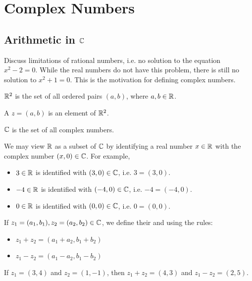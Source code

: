 \documentclass[11pt,fleqn,dvipsnames,usenames]{article}
\newcommand{\p}{\noindent}
\begin{document}
\section{Complex Numbers}

\subsection{Arithmetic in $\mathbb{C}$}

\p Discuss limitations of rational numbers, i.e. no solution to the equation $x^2 - 2 = 0$.  While the real numbers do not have this problem, there is still no solution to $x^2 + 1 = 0$.  This is the motivation for defining complex numbers.
\vsp

\recall $\mathbb{R}^{2}$ is the set of all ordered pairs $(a,b)$, where $a,b\in\mathbb{R}$.

\begin{definition}
A  $z = (a,b)$ is an element of $\mathbb{R}^{2}$.
\end{definition}

\notation $\mathbb{C}$ is the set of all complex numbers.
\vsp

\begin{remark}
We may view $\mathbb{R}$ as a subset of $\mathbb{C}$ by identifying a real number $x\in\mathbb{R}$ with the complex number $(x,0)\in\mathbb{C}$.  For example,
\begin{itemize}
\item $3\in\mathbb{R}$ is identified with $(3,0)\in\mathbb{C}$, i.e. $3 = (3,0)$.
\item $-4\in\mathbb{R}$ is identified with $(-4,0)\in\mathbb{C}$, i.e. $-4 = (-4,0)$.
\item $0\in\mathbb{R}$ is identified with $(0,0)\in\mathbb{C}$, i.e. $0 = (0,0)$.
\end{itemize}
\end{remark}

\begin{definition}
If $z_{1} = (a_{1},b_{1}), z_{2} = (a_{2},b_{2})\in\mathbb{C}$, we define their  and  using the rules:
\begin{itemize}
\item $z_{1} + z_{2} = (a_{1} + a_{2}, b_{1} + b_{2})$
\item $z_{1} - z_{2} = (a_{1} - a_{2}, b_{1} - b_{2})$
\end{itemize}
\end{definition}

\begin{example}
If $z_{1} = (3,4)$ and $z_{2} = (1,-1)$, then $z_{1} + z_{2} = (4, 3)$ and $z_{1} - z_{2} = (2,5)$.
\end{example}
\end{document}
